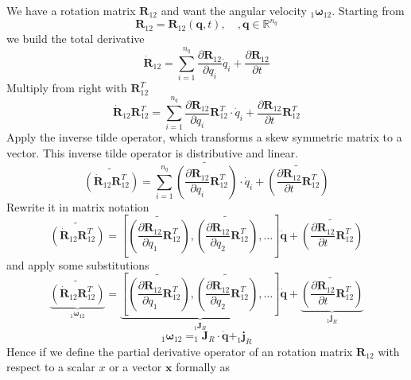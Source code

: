 \documentclass{report}
\newcommand{\bs}[1]{\boldsymbol #1}
\begin{document}
We have a rotation matrix $\bs{R}_{12}$ and want the angular velocity $_1\bs{\omega}_{12}$. Starting from
\begin{equation}
\bs{R}_{12}=\bs{R}_{12}(\bs{q},t),\quad,\bs{q}\in\mathbb{R}^{n_q}
\end{equation}
we build the total derivative
\begin{equation}
\dot{\bs{R}}_{12}=\sum_{i=1}^{n_q} \frac{\partial \bs{R}_{12}}{\partial q_i}\dot{q}_i + \frac{\partial \bs{R}_{12}}{\partial t}
\end{equation}
Multiply from right with $\bs{R}_{12}^T$
\begin{equation}
\dot{\bs{R}}_{12}\bs{R}_{12}^T=\sum_{i=1}^{n_q} \frac{\partial \bs{R}_{12}}{\partial q_i}\bs{R}_{12}^T\cdot\dot{q}_i + \frac{\partial \bs{R}_{12}}{\partial t}\bs{R}_{12}^T
\end{equation}
Apply the inverse tilde operator, which transforms a skew symmetric matrix to a vector. This inverse tilde operator is distributive and linear.
\begin{equation}
\widetilde{\left(\dot{\bs{R}}_{12}\bs{R}_{12}^T\right)}=\sum_{i=1}^{n_q} \widetilde{\left(\frac{\partial \bs{R}_{12}}{\partial q_i}\bs{R}_{12}^T\right)}\cdot\dot{q}_i + \widetilde{\left(\frac{\partial \bs{R}_{12}}{\partial t}\bs{R}_{12}^T\right)}
\end{equation}
Rewrite it in matrix notation
\begin{equation}
\widetilde{\left(\dot{\bs{R}}_{12}\bs{R}_{12}^T\right)}=\left[\widetilde{\left(\frac{\partial \bs{R}_{12}}{\partial q_1}\bs{R}_{12}^T\right)},\widetilde{\left(\frac{\partial \bs{R}_{12}}{\partial q_2}\bs{R}_{12}^T\right)},\dots\right]\dot{\bs{q}} + \widetilde{\left(\frac{\partial \bs{R}_{12}}{\partial t}\bs{R}_{12}^T\right)}
\end{equation}
and apply some substitutions
\begin{equation}
\underbrace{\widetilde{\left(\dot{\bs{R}}_{12}\bs{R}_{12}^T\right)}}_{_1\bs{\omega}_{12}}=\underbrace{\left[\widetilde{\left(\frac{\partial \bs{R}_{12}}{\partial q_1}\bs{R}_{12}^T\right)},\widetilde{\left(\frac{\partial \bs{R}_{12}}{\partial q_2}\bs{R}_{12}^T\right)},\dots\right]}_{_1\bs{J}_R}\dot{\bs{q}} + \underbrace{\widetilde{\left(\frac{\partial \bs{R}_{12}}{\partial t}\bs{R}_{12}^T\right)}}_{_1\bs{j}_R}
\end{equation}
\begin{equation}
_1\bs{\omega}_{12}=_1\bs{J}_R\cdot \dot{\bs{q}} + _1\bs{j}_R
\end{equation}
Hence if we define the partial derivative operator of an rotation matrix $\bs{R}_{12}$ with respect to a scalar $x$ or a vector $\bs{x}$ formally as
\end{document}
